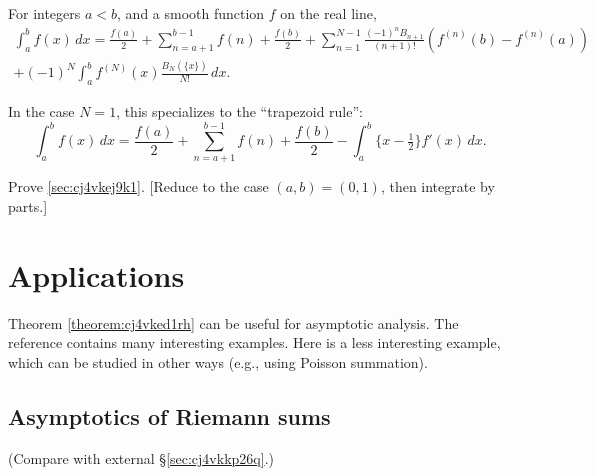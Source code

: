 \documentclass[reqno]{amsart} 
\begin{document}
\begin{theorem}\label{theorem:cj4vked1rh}
  For integers $a < b$, and a smooth function $f$ on the real line,
\begin{align*}
  \int_{a}^b f (x) \, d x = \frac{f (a) }{2} + \sum_{n = a + 1}^{b - 1} f (n)
  + \frac{f (b)}{2} 
  + \sum_{n = 1}^{N - 1 } \frac{(- 1 )^n B_{n + 1 }}{ (n + 1 )!}
  \left( f^{(n) } (b ) - f^{(n )} (a) \right) \\
  + (- 1)^N \int_{a}^b f^{(N)} (x) \frac{B_N (\{x\})}{N!} \, d x.
\end{align*}
\end{theorem}

\begin{example}
  In the case $N=1$, this specializes to the ``trapezoid rule'':
  \begin{equation*}
    \int_a^b f (x) \, d x
    =
    \frac{f (a) }{2} + \sum_{n = a + 1}^{b - 1} f (n)
  + \frac{f (b)}{2} 
  - \int_{a}^b \{ x - \tfrac{1}{2} \} f' (x)\, d x.
\end{equation*}
\end{example}
\begin{exercise}
Prove \ref{sec:cj4vkej9k1}.  [Reduce to the case $(a,b) = (0,1)$, then integrate by parts.]
\end{exercise}

\section{Applications}

Theorem \ref{theorem:cj4vked1rh} can be useful for asymptotic analysis.  The reference \cite[\S4]{zagier-mellin} contains many interesting examples.  Here is a less interesting example, which can be studied in other ways (e.g., using Poisson summation).

\subsection{Asymptotics of Riemann sums}\label{sec:cj4vkfaant}
(Compare with external \S\ref{sec:cj4vkkp26q}.)
\end{document}
